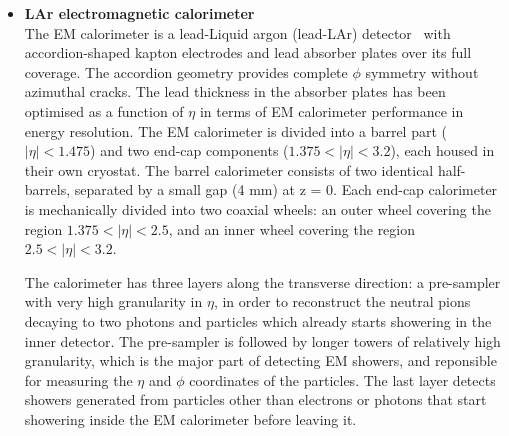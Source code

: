 	\begin{itemize}
		\item \textbf{LAr electromagnetic calorimeter} \\
		The EM calorimeter is a 
		lead-Liquid argon (lead-LAr) detector~\cite{ATLAS-TDR-02} with accordion-shaped kapton electrodes and lead 
		absorber plates over its full coverage. The accordion geometry provides 
		complete $\phi$ symmetry without azimuthal cracks. The lead thickness in 
		the absorber plates has been optimised as a function of $\eta$ in terms of EM calorimeter
		performance in energy resolution. 
		The EM calorimeter is divided into a barrel part ($|\eta| < 1.475$) 
		and two end-cap components ($1.375 < |\eta|< 3.2$), each housed 
		in their own cryostat.
		The barrel calorimeter
		consists of two identical half-barrels, separated by a small gap (4 mm) at z = 0. 
		Each end-cap calorimeter is mechanically divided into two coaxial wheels: 
		an outer wheel covering the region $1.375 < |\eta|< 2.5$, and an inner wheel 
		covering the region $2.5 < |\eta|< 3.2$.
		
		The calorimeter has three layers along the transverse direction:
		a pre-sampler with very high granularity in $\eta$, in order to 
		reconstruct the neutral pions decaying to two photons and particles 
		which already starts showering in the inner detector. 
		The pre-sampler is followed by longer towers of relatively 
		high granularity, which is the major part of detecting EM showers, 
		and reponsible for measuring the $\eta$ and $\phi$ coordinates of 
		the particles. The last layer detects showers generated from 
		particles other than electrons or photons that start showering 
		inside the EM calorimeter before leaving it.


\end{itemize}
